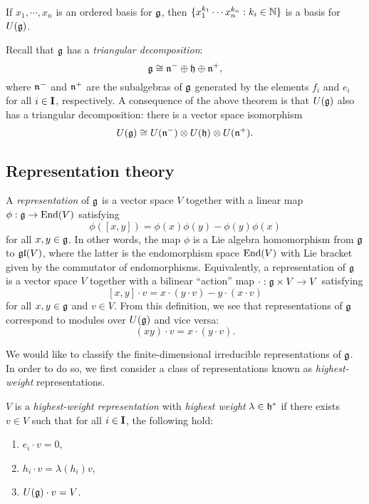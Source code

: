 \begin{theorem}\label{T:PBW-g}
    If $x_1,\cdots,x_n$ is an ordered basis for $\mathfrak{g}$, then $\{x_1^{k_1}\cdots x_n^{k_n} : k_i\in\mathbb{N}\}$ is a basis for $U(\mathfrak{g})$.
\end{theorem}

Recall that $\mathfrak{g}$ has a \emph{triangular decomposition}:
\[\mathfrak{g} \cong \mathfrak{n}^-\oplus\mathfrak{h}\oplus\mathfrak{n}^+,\]
where $\mathfrak{n}^-$ and $\mathfrak{n}^+$ are the subalgebras of $\mathfrak{g}$ generated by the elements $f_i$ and $e_i$ for all $i\in\mathbf{I}$, respectively.
A consequence of the above theorem is that $U(\mathfrak{g})$ also has a triangular decomposition: there is a vector space isomorphism
\[U(\mathfrak{g}) \cong U(\mathfrak{n}^-)\otimes U(\mathfrak{h}) \otimes U(\mathfrak{n}^+).\]


\subsection{Representation theory}

A \emph{representation} of $\mathfrak{g}$ is a vector space $V$ together with a linear map $\phi:\mathfrak{g}\to\operatorname{End}(V)$ satisfying
\[\phi([x,y]) = \phi(x)\phi(y)-\phi(y)\phi(x)\]
for all $x,y\in\mathfrak{g}$.
In other words, the map $\phi$ is a Lie algebra homomorphism from $\mathfrak{g}$ to $\mathfrak{gl}(V)$, where the latter is the endomorphism space $\operatorname{End}(V)$ with Lie bracket given by the commutator of endomorphisms.
Equivalently, a representation of $\mathfrak{g}$ is a vector space $V$ together with a bilinear ``action'' map $\cdot:\mathfrak{g}\times V\to V$ satisfying
\[[x,y]\cdot v = x\cdot(y\cdot v) - y\cdot(x\cdot v)\]
for all $x,y\in\mathfrak{g}$ and $v\in V$.
From this definition, we see that representations of $\mathfrak{g}$ correspond to modules over $U(\mathfrak{g})$ and vice versa:
\[(xy)\cdot v = x\cdot (y\cdot v).\]

We would like to classify the finite-dimensional irreducible representations of $\mathfrak{g}$.
In order to do so, we first consider a class of representations known as \emph{highest-weight} representations.

\begin{definition}\label{D:hw-g}
    $V$ is a \emph{highest-weight representation} with \emph{highest weight} $\lambda\in\mathfrak{h}^*$ if there exists $v\in V$ such that for all $i\in\mathbf{I}$, the following hold:
    \begin{enumerate}
        \item $e_i\cdot v = 0$,
        \item $h_i\cdot v = \lambda(h_i)v$,
        \item $U(\mathfrak{g})\cdot v = V$.
    \end{enumerate}
\end{definition}

